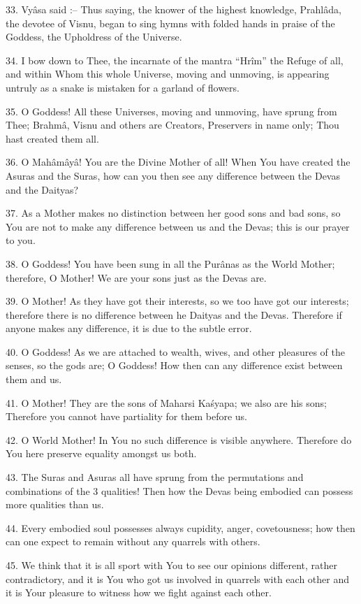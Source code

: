 33. Vy\^asa said :-- Thus saying, the knower of the highest knowledge, Prahl\^ada, the devotee of Visnu, began to sing hymns with folded hands in praise of the Goddess, the Upholdress of the Universe.

34. I bow down to Thee, the incarnate of the mantra ``Hr\^im'' the Refuge of all, and within Whom this whole Universe, moving and unmoving, is appearing untruly as a snake is mistaken for a garland of flowers.

35. O Goddess! All these Universes, moving and unmoving, have sprung from Thee; Brahm\^a, Visnu and others are Creators, Preservers in name only; Thou hast created them all.

36. O Mah\^am\^ay\^a! You are the Divine Mother of all! When You have created the Asuras and the Suras, how can you then see any difference between the Devas and the Daityas?

37. As a Mother makes no distinction between her good sons and bad sons, so You are not to make any difference between us and the Devas; this is our prayer to you.

38. O Goddess! You have been sung in all the Pur\^anas as the World Mother; therefore, O Mother! We are your sons just as the Devas are.

39. O Mother! As they have got their interests, so we too have got our interests; therefore there is no difference between he Daityas and the Devas. Therefore if anyone makes any difference, it is due to the subtle error.

40. O Goddess! As we are attached to wealth, wives, and other pleasures of the senses, so the gods are; O Goddess! How then can any difference exist between them and us.

41. O Mother! They are the sons of Maharsi Ka\'syapa; we also are his sons; Therefore you cannot have partiality for them before us.

42. O World Mother! In You no such difference is visible anywhere. Therefore do You here preserve equality amongst us both.

43. The Suras and Asuras all have sprung from the permutations and combinations of the 3 qualities! Then how the Devas being embodied can possess more qualities than us.

44. Every embodied soul possesses always cupidity, anger, covetousness; how then can one expect to remain without any quarrels with others.

45. We think that it is all sport with You to see our opinions different, rather contradictory, and it is You who got us involved in quarrels with each other and it is Your pleasure to witness how we fight against each other.

